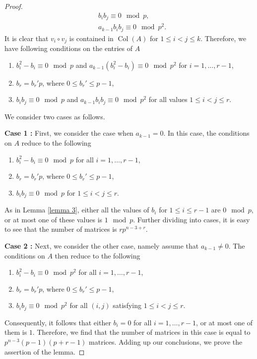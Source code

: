 \documentclass[a4paper]{amsart}
\numberwithin{equation}{section}
\theoremstyle{remark}
\newcommand{\op}[1]{\operatorname{#1}}
\begin{document}
\begin{proof}
	\begin{equation}
 \begin{split}
	    & b_i b_j \equiv 0 \mod p,\\
	    & a_{k-1}b_i b_j \equiv 0 \mod p^2.
     \end{split}
	\end{equation}
It is clear that $v_i\circ v_j$ is contained in $\op{Col}(A)$ for $1 \leq i < j \leq k$. Therefore, we have following conditions on the entries of $A$
	\begin{enumerate}
	    \item $b_i^2-b_i \equiv 0 \mod p$ and $a_{k-1}(b_i^2-b_i) \equiv 0 \mod p^2$ for $i=1,\dots,r-1$,
	    \item $b_r = b_r' p$, where $0 \leq b_r' \leq p-1$,
	    \item $b_i b_j \equiv 0 \mod p$ and $a_{k-1}b_i b_j \equiv 0 \mod p^2$ for all values $1 \leq i < j \leq r$.
	\end{enumerate}
	We consider two cases as follows.
	\par \textbf{Case 1 :} First, we consider the case when $a_{k-1} = 0$. In this case, the conditions on $A$ reduce to the following
	\begin{enumerate}
	    \item $b_i^2-b_i \equiv 0 \mod p$ for all $i=1,\dots,r-1$,
	    \item $b_r = b_r' p$, where $0 \leq b_r' \leq p-1$,
	    \item $b_i b_j \equiv 0 \mod p$ for $1 \leq i < j \leq r$.
	\end{enumerate}
	As in Lemma \ref{lemma 3}, either all the values of $b_i$ for $1 \leq i \leq r-1$ are $0 \mod p$, or at most one of these values is $1 \mod p$. Further dividing into cases, it is easy to see that the number of matrices is $rp^{n-3+r}$.
	\par \textbf{Case 2 :} Next, we consider the other case, namely assume that $a_{k-1} \neq 0$. The conditions on $A$ then reduce to the following
	\begin{enumerate}
	    \item $b_i^2-b_i \equiv 0 \mod p^2$ for all $i=1,\dots,r-1$,
	    \item $b_r = b_r' p$, where $0 \leq b_r' \leq p-1$,
	    \item $b_i b_j \equiv 0 \mod p^2$ for all $(i,j)$ satisfying $1 \leq i < j \leq r$.
	\end{enumerate}
	Consequently, it follows that either $b_i=0$ for all $i=1,\dots,r-1$, or at most one of them is $1$. Therefore, we find that the number of matrices in this case is equal to $p^{n-3}(p-1)(p+r-1)$ matrices. Adding up our conclusions, we prove the assertion of the lemma. 
 \end{proof}
\end{document}
